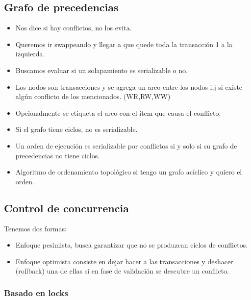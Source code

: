\subsection*{Grafo de precedencias}
\begin{itemize}
\item Nos dice si hay conflictos, no los evita.
\item Queremos ir swappeando y llegar a que quede toda la transacción 1 a la izquierda.
\item Buscamos evaluar si un solapamiento es serializable o no.
\item Los nodos son transacciones y se agrega un arco entre los nodos i,j si existe algún conflicto de los mencionados. (WR,RW,WW)
\item Opcionalmente se etiqueta el arco con el item que causa el conflicto.
\item Si el grafo tiene ciclos, no es serializable.
\item Un orden de ejecución es serializable por conflictos si y solo si su grafo de precedencias no tiene ciclos.
\item Algoritmo de ordenamiento topológico si tengo un grafo acíclico y quiero el orden.
\end{itemize}

\subsection*{Control de concurrencia}

Tenemos dos formas:
\begin{itemize}
\item Enfoque pesimista, busca garantizar que no se produzcan ciclos de conflictos.
\item Enfoque optimista consiste en dejar hacer a las transacciones y deshacer (rollback) una de ellas si en fase de validación se descubre un conflicto.
\end{itemize}

\subsubsection*{Basado en locks}

